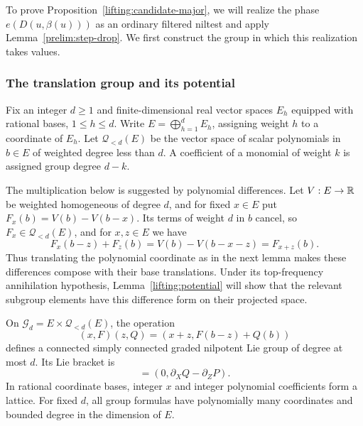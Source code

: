 To prove Proposition~\ref{lifting:candidate-major}, we will realize the
phase $e(D(u,\beta(u)))$ as an ordinary filtered niltest and apply
Lemma~\ref{prelim:step-drop}.  We first construct the group in which
this realization takes values.

\subsubsection{The translation group and its potential}

Fix an integer $d\geq1$ and finite-dimensional real vector spaces $E_h$
equipped with rational bases, $1\leq h\leq d$.
Write $E=\bigoplus_{h=1}^dE_h$, assigning weight $h$ to a coordinate of
$E_h$.  Let $\mathscr Q_{<d}(E)$ be the vector space of scalar polynomials
in $b\in E$ of weighted degree less than $d$.  A coefficient of a
monomial of weight $k$ is assigned group degree $d-k$.

The multiplication below is suggested by polynomial differences.
Let $V:E\to\mathbb R$ be weighted homogeneous of degree $d$, and for fixed
$x\in E$ put $F_x(b)=V(b)-V(b-x)$.  Its terms of weight $d$ in $b$
cancel, so $F_x\in\mathscr Q_{<d}(E)$, and for $x,z\in E$ we have
\[
 F_x(b-z)+F_z(b)=V(b)-V(b-x-z)=F_{x+z}(b).
\]
Thus translating the polynomial coordinate as in the next lemma makes
these differences compose with their base translations.  Under its
top-frequency annihilation hypothesis, Lemma~\ref{lifting:potential}
will show that the relevant subgroup elements have this difference
form on their projected space.

\begin{lemma}
\label{lifting:translation-group}
On $\mathscr G_d=E\times\mathscr Q_{<d}(E)$, the operation
\begin{equation}
 (x,F)(z,Q)=(x+z,F(b-z)+Q(b))
 \label{lifting:group-law}
\end{equation}
defines a connected simply connected graded nilpotent Lie group of
degree at most $d$.  Its Lie bracket is
\begin{equation}
 [(X,P),(Z,Q)]=(0,\partial_XQ-\partial_ZP).
 \label{lifting:bracket}
\end{equation}
In rational coordinate bases, integer $x$ and integer polynomial
coefficients form a lattice.  For fixed $d$, all group formulas have
polynomially many coordinates and bounded degree in the dimension of
$E$.
\end{lemma}

